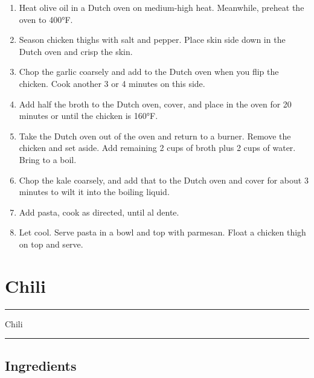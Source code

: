 \documentclass[11pt,]{article}
\begin{document}
\begin{enumerate}
\def\labelenumi{\arabic{enumi}.}
\item
  Heat olive oil in a Dutch oven on medium-high heat. Meanwhile, preheat
  the oven to 400°F.
\item
  Season chicken thighs with salt and pepper. Place skin side down in
  the Dutch oven and crisp the skin.
\item
  Chop the garlic coarsely and add to the Dutch oven when you flip the
  chicken. Cook another 3 or 4 minutes on this side.
\item
  Add half the broth to the Dutch oven, cover, and place in the oven for
  20 minutes or until the chicken is 160°F.
\item
  Take the Dutch oven out of the oven and return to a burner. Remove the
  chicken and set aside. Add remaining 2 cups of broth plus 2 cups of
  water. Bring to a boil.
\item
  Chop the kale coarsely, and add that to the Dutch oven and cover for
  about 3 minutes to wilt it into the boiling liquid.
\item
  Add pasta, cook as directed, until al dente.
\item
  Let cool. Serve pasta in a bowl and top with parmesan. Float a chicken
  thigh on top and serve.
\end{enumerate}

\break 

\section{Chili}\label{chili}

\hrule  \vspace{5 mm}

\HUGE Chili \normalsize\vspace{5 mm} \hrule 

\subsection{Ingredients}\label{ingredients-1}
\end{document}
